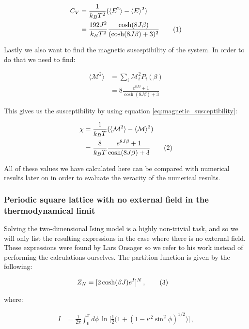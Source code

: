\documentclass[reprint,english,notitlepage]{revtex4-1}  %
\newcommand\numberthis{\addtocounter{equation}{1}\tag{\theequation}}
\begin{document}
\begin{align*}
C_V &= \frac{1}{k_B T^2} ( \langle E^2 \rangle - \langle E \rangle^2) \\
&= \frac{192J^2}{k_B T^2} \frac{\cosh(8J\beta)}{(\cosh(8J\beta) + 3)^2} \numberthis \label{eq:2x2_heat_capacity}
\end{align*}

Lastly we also want to find the magnetic susceptibility of the system. In order to do that we need to find:

\begin{align*}
\langle \mathcal{M}^2 \rangle &= \sum\limits_i \mathcal{M}_i^2 P_i(\beta) \\
&= 8 \frac{e^{8J\beta} + 1}{\cosh(8J\beta) + 3}
\end{align*}

This gives us the susceptibility by using equation \eqref{eq:magnetic_susceptibility}:

\begin{align*}
\chi &= \frac{1}{k_B T} ( \langle \mathcal{M}^2 \rangle - \langle \mathcal{M} \rangle^2 ) \\
&= \frac{8}{k_B T} \frac{e^{8J \beta} + 1}{\cosh( 8J \beta) + 3} \numberthis \label{eq:2x2_susceptibility}
\end{align*}

All of these values we have calculated here can be compared with numerical results later on in order to evaluate the veracity of the numerical results.


\subsubsection{Periodic square lattice with no external field in the thermodynamical limit} \label{sec:II:a:ii}

Solving the two-dimensional Ising model is a highly non-trivial task, and so we will only list the resulting expressions in the case where there is no external field. These expressions were found by Lars Onsager so we refer to his work \citep{L.Onsager1944} instead of performing the calculations ourselves. The partition function is given by the following:

\begin{align*}
Z_N &= [2\cosh(\beta J) e^I ]^N \, , \numberthis \label{eq:LO_partition_function}
\end{align*}

where: 

\begin{align*}
I &= \frac{1}{2\pi} \int_0^\pi d\phi \, \ln \bigg[\frac{1}{2}\bigg( 1 + ( 1 - \kappa^2 \sin^2 \phi)^{1/2} \bigg) \bigg] \, , 
\end{align*}
\end{document}
